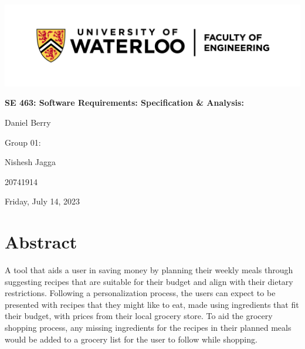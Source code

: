 \documentclass[11pt, letterpaper]{report}
\begin{document}
\begin{titlepage}
    \centering
    \includegraphics[width=\textwidth]{images/logo.png}\par
    \vspace{1cm}
    {\bfseries SE 463: Software Requirements: Specification \& Analysis: \par}
    \vspace{0.5cm}
    {Daniel Berry \par}
    \vspace{5cm}
    {Group 01: \par}
    {Nishesh Jagga \par}
    {20741914 \par}
    \vspace{5cm}
    {Friday, July 14, 2023 \par}
\end{titlepage}
\restoregeometry

\tableofcontents
\thispagestyle{empty}
\clearpage

\pagestyle{fancy}
\fancyhf{}
\rfoot{\thepage}
\renewcommand{\headrulewidth}{0pt}

\chapter{Abstract}
\setcounter{page}{1}
A tool that aids a user in saving money by planning their weekly meals through suggesting recipes that are suitable for their budget and align with their dietary restrictions. Following a personalization process, the users can expect to be presented with recipes that they might like to eat, made using ingredients that fit their budget, with prices from their local grocery store. To aid the grocery shopping process, any missing ingredients for the recipes in their planned meals would be added to a grocery list for the user to follow while shopping.

\end{document}
